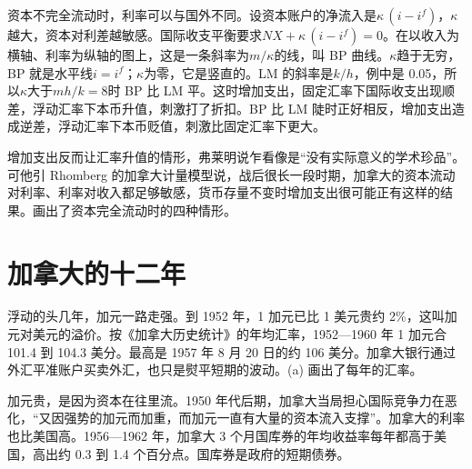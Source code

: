 资本不完全流动时，利率可以与国外不同。设资本账户的净流入是$\kappa\,(i-i^{f})$，$\kappa$越大，资本对利差越敏感。国际收支平衡要求$\mathit{NX}+\kappa\,(i-i^{f})=0$。在以收入为横轴、利率为纵轴的图上，这是一条斜率为$m/\kappa$的线，叫 BP 曲线。$\kappa$趋于无穷，BP 就是水平线$i=i^{f}$；$\kappa$为零，它是竖直的。LM 的斜率是$k/h$，例中是 0.05，所以$\kappa$大于$mh/k=8$时 BP 比 LM 平。这时增加支出，固定汇率下国际收支出现顺差，浮动汇率下本币升值，刺激打了折扣\cite{fleming1962}。BP 比 LM 陡时正好相反，增加支出造成逆差，浮动汇率下本币贬值，刺激比固定汇率下更大\cite{fleming1962}。

增加支出反而让汇率升值的情形，弗莱明说乍看像是“没有实际意义的学术珍品”\cite{fleming1962}。可他引 Rhomberg 的加拿大计量模型说，战后很长一段时期，加拿大的资本流动对利率、利率对收入都足够敏感，货币存量不变时增加支出很可能正有这样的结果\cite{fleming1962}。画出了资本完全流动时的四种情形。


\section{加拿大的十二年}\label{sec:mundell-canada}

浮动的头几年，加元一路走强。到 1952 年，1 加元已比 1 美元贵约 2\%，这叫加元对美元的溢价\cite{powell2005}。按《加拿大历史统计》的年均汇率，1952—1960 年 1 加元合 101.4 到 104.3 美分\cite{hsc1983}。最高是 1957 年 8 月 20 日的约 106 美分\cite{powell2005}。加拿大银行通过外汇平准账户买卖外汇，也只是熨平短期的波动\cite{powell2005}。(a) 画出了每年的汇率。

加元贵，是因为资本在往里流。1950 年代后期，加拿大当局担心国际竞争力在恶化，“又因强势的加元而加重，而加元一直有大量的资本流入支撑”\cite{powell2005}。加拿大的利率也比美国高。1956—1962 年，加拿大 3 个月国库券的年均收益率每年都高于美国，高出约 0.3 到 1.4 个百分点\cite{hsc1983,erp1964}。国库券是政府的短期债券。

